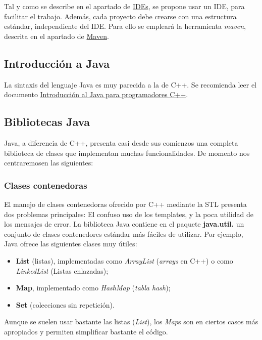 \documentclass[11pt]{article}
\begin{document}
Tal y como se describe en el apartado de \hyperref[sec-3]{IDEs}, se propone usar
un IDE, para facilitar el trabajo. Además, cada proyecto debe crearse con una
estructura estándar, independiente del IDE. Para ello se empleará la herramienta
\emph{maven}, descrita en el apartado de \hyperref[sec-5]{Maven}.


\subsection{Introducción a Java} \label{sec-2-1}
\label{fd70e36c-20a8-4577-90be-f671166ae3f1}


La sintaxis del lenguaje Java es muy parecida a la de C++. Se recomienda leer el
documento \href{http://www.xtec.es/~acastan/textos/Java.pdf}{Introducción al
Java para programadores C++}.


\subsection{Bibliotecas Java} \label{sec-2-2} Java, a diferencia de C++,
presenta casi desde sus comienzos una completa biblioteca de clases que
implementan muchas funcionalidades. De momento nos centraremosen las siguientes:

\subsubsection{Clases contenedoras} \label{sec-2-2-1} El manejo de clases
contenedoras ofrecido por C++ mediante la STL presenta dos problemas
principales: El confuso uso de los templates, y la poca utilidad de los mensajes
de error. La biblioteca Java contiene en el paquete \textbf{java.util.\*} un
conjunto de clases contenedores estándar más fáciles de utilizar. Por ejemplo,
Java ofrece las siguientes clases muy útiles:

\begin{itemize} \item \textbf{List} (listas), implementadas como
\emph{ArrayList} (\emph{arrays} en C++) o como \emph{LinkedList} (Listas
enlazadas); \item \textbf{Map}, implementado como \emph{HashMap} (\emph{tabla
hash}); \item \textbf{Set} (colecciones sin repetición). \end{itemize}

Aunque se suelen usar bastante las listas (\emph{List}), los \emph{Map}s son en
ciertos casos más apropiados y permiten simplificar bastante el código.
\end{document}
